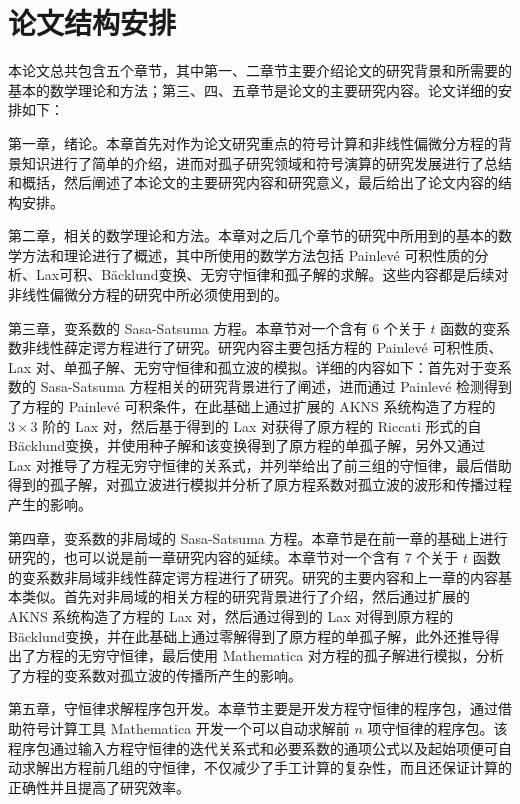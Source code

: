 \section{论文结构安排}
本论文总共包含五个章节，其中第一、二章节主要介绍论文的研究背景和所需要的基本的数学理论和方法；第三、四、五章节是论文的主要研究内容。论文详细的安排如下：

第一章，绪论。本章首先对作为论文研究重点的符号计算和非线性偏微分方程的背景知识进行了简单的介绍，进而对孤子研究领域和符号演算的研究发展进行了总结和概括，然后阐述了本论文的主要研究内容和研究意义，最后给出了论文内容的结构安排。

第二章，相关的数学理论和方法。本章对之后几个章节的研究中所用到的基本的数学方法和理论进行了概述，其中所使用的数学方法包括 Painlev\'{e} 可积性质的分析、Lax可积、B\"{a}cklund变换、无穷守恒律和孤子解的求解。这些内容都是后续对非线性偏微分方程的研究中所必须使用到的。

第三章，变系数的 Sasa-Satsuma 方程。本章节对一个含有 6 个关于 $t$ 函数的变系数非线性薛定谔方程进行了研究。研究内容主要包括方程的 Painlev\'{e} 可积性质、Lax 对、单孤子解、无穷守恒律和孤立波的模拟。详细的内容如下：首先对于变系数的 Sasa-Satsuma 方程相关的研究背景进行了阐述，进而通过  Painlev\'{e} 检测得到了方程的  Painlev\'{e} 可积条件，在此基础上通过扩展的 AKNS 系统构造了方程的 $3 \times 3$ 阶的 Lax 对，然后基于得到的 Lax 对获得了原方程的 Riccati 形式的自 B\"{a}cklund变换，并使用种子解和该变换得到了原方程的单孤子解，另外又通过 Lax 对推导了方程无穷守恒律的关系式，并列举给出了前三组的守恒律，最后借助得到的孤子解，对孤立波进行模拟并分析了原方程系数对孤立波的波形和传播过程产生的影响。

第四章，变系数的非局域的 Sasa-Satsuma 方程。本章节是在前一章的基础上进行研究的，也可以说是前一章研究内容的延续。本章节对一个含有 7 个关于 $t$ 函数的变系数非局域非线性薛定谔方程进行了研究。研究的主要内容和上一章的内容基本类似。首先对非局域的相关方程的研究背景进行了介绍，然后通过扩展的 AKNS 系统构造了方程的 Lax 对，然后通过得到的 Lax 对得到原方程的 B\"{a}cklund变换，并在此基础上通过零解得到了原方程的单孤子解，此外还推导得出了方程的无穷守恒律，最后使用 Mathematica 对方程的孤子解进行模拟，分析了方程的变系数对孤立波的传播所产生的影响。

第五章，守恒律求解程序包开发。本章节主要是开发方程守恒律的程序包，通过借助符号计算工具 Mathematica 开发一个可以自动求解前 $n$ 项守恒律的程序包。该程序包通过输入方程守恒律的迭代关系式和必要系数的通项公式以及起始项便可自动求解出方程前几组的守恒律，不仅减少了手工计算的复杂性，而且还保证计算的正确性并且提高了研究效率。












